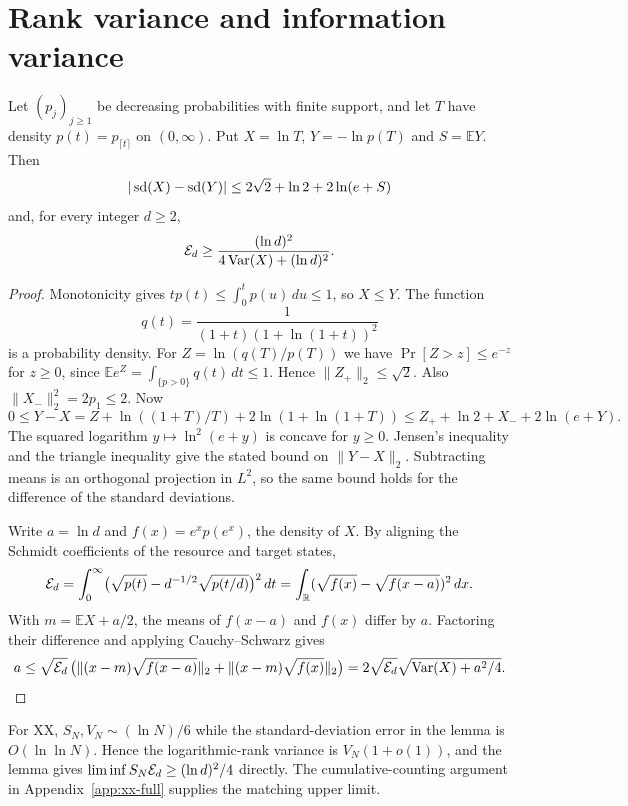 \section{Rank variance and information variance}\label{app:rank-variance}
\begin{lemma}
\label{lem:rank-info}
Let $(p_j)_{j\ge1}$ be decreasing probabilities with finite support, and let
$T$ have density $p(t)=p_{\lceil t\rceil}$ on $(0,\infty)$. Put $X=\ln T$,
$Y=-\ln p(T)$ and $S=\mathbb E Y$. Then
\[
|\operatorname{sd}(X)-\operatorname{sd}(Y)|\le 2\sqrt2+\ln2+2\ln(e+S)
\]
and, for every integer $d\ge 2$,
\[
\mathcal E_d\ge \frac{(\ln d)^2}{4\operatorname{Var}(X)+(\ln d)^2}.
\]
\end{lemma}

\begin{proof}
Monotonicity gives $t p(t)\le\int_0^t p(u)\,du\le1$, so $X\le Y$.
The function
\[
q(t)=\frac{1}{(1+t)(1+\ln(1+t))^2}
\]
is a probability density. For $Z=\ln(q(T)/p(T))$ we have
$\Pr[Z>z]\le e^{-z}$ for $z\ge0$, since
$\mathbb E e^Z=\int_{\{p>0\}}q(t)\,dt\le1$. Hence
$\|Z_+\|_2\le\sqrt2$. Also $\|X_-\|_2^2=2p_1\le2$. Now
\[
0\le Y-X
 =Z+\ln((1+T)/T)+2\ln(1+\ln(1+T))
 \le Z_+ +\ln 2+X_-+2\ln(e+Y).
\]
The squared logarithm $y\mapsto\ln^2(e+y)$ is concave for $y\ge0$.
Jensen's inequality and the triangle inequality give the stated bound on
$\|Y-X\|_2$. Subtracting means is an orthogonal projection in $L^2$, so the
same bound holds for the difference of the standard deviations.

Write $a=\ln d$ and $f(x)=e^x p(e^x)$, the density of $X$.
By aligning the Schmidt coefficients of the resource and target states,
\[
\mathcal E_d=\int_0^\infty
\bigl(\sqrt{p(t)}-d^{-1/2}\sqrt{p(t/d)}\bigr)^2\,dt
=\int_\mathbb R(\sqrt{f(x)}-\sqrt{f(x-a)})^2\,dx.
\]
With $m=\mathbb E X+a/2$, the means of $f(x-a)$ and $f(x)$ differ by $a$.
Factoring their difference and applying Cauchy--Schwarz gives
\[
a\le \sqrt{\mathcal E_d}\,
\bigl(\|(x-m)\sqrt{f(x-a)}\|_2+\|(x-m)\sqrt{f(x)}\|_2\bigr)
=2\sqrt{\mathcal E_d}\sqrt{\operatorname{Var}(X)+a^2/4}.
\]
\end{proof}
For XX, $S_N,V_N\sim(\ln N)/6$ while the standard-deviation error in the
lemma is $O(\ln\ln N)$. Hence the logarithmic-rank variance is
$V_N(1+o(1))$, and the lemma gives
$\liminf S_N\mathcal{E}_d\ge(\ln d)^2/4$ directly. The cumulative-counting
argument in Appendix~\ref{app:xx-full} supplies the matching upper limit.
